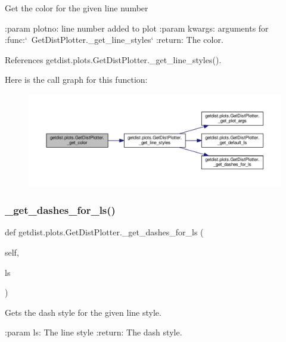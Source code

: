 \begin{DoxyVerb}Get the color for the given line number

:param plotno: line number added to plot
:param kwargs: arguments for :func:`~GetDistPlotter._get_line_styles`
:return: The color.
\end{DoxyVerb}
 

References getdist.\+plots.\+Get\+Dist\+Plotter.\+\_\+get\+\_\+line\+\_\+styles().

Here is the call graph for this function\+:
\nopagebreak
\begin{figure}[H]
\begin{center}
\leavevmode
\includegraphics[width=350pt]{classgetdist_1_1plots_1_1GetDistPlotter_afe806ee81dad4b9d7c3f2c5e55846b95_cgraph}
\end{center}
\end{figure}
\mbox{\label{classgetdist_1_1plots_1_1GetDistPlotter_abde32f397bb48f38fb3a99ec754c6487}} 
\subsubsection{\texorpdfstring{\+\_\+get\+\_\+dashes\+\_\+for\+\_\+ls()}{\_get\_dashes\_for\_ls()}}
{\footnotesize\ttfamily def getdist.\+plots.\+Get\+Dist\+Plotter.\+\_\+get\+\_\+dashes\+\_\+for\+\_\+ls (\begin{DoxyParamCaption}\item[{}]{self,  }\item[{}]{ls }\end{DoxyParamCaption})\hspace{0.3cm}{\ttfamily [private]}}

\begin{DoxyVerb}Gets the dash style for the given line style.

:param ls: The line style
:return: The dash style.
\end{DoxyVerb}
 

